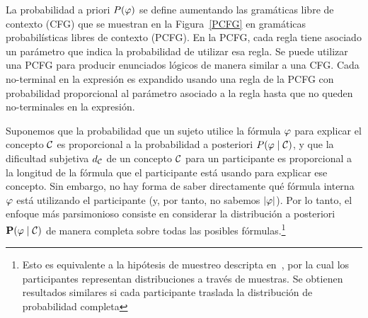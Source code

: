 La probabilidad a priori $P(\varphi)$ se define aumentando las gramáticas libre de contexto (CFG) que se muestran en la Figura~\ref{PCFG}  en gramáticas probabilísticas libres de contexto (PCFG). En la PCFG, cada regla tiene asociado un parámetro que indica la probabilidad de utilizar esa regla. Se puede utilizar una PCFG para producir enunciados lógicos de manera similar a una CFG. Cada no-terminal en la expresión es expandido usando una regla de la PCFG con probabilidad proporcional al parámetro asociado a la regla hasta que no queden no-terminales en la expresión. 


Suponemos que la probabilidad que un sujeto utilice la fórmula $\varphi$ para explicar el concepto $\mathcal{C}$ es proporcional a la probabilidad a posteriori $P(\varphi \mid \mathcal{C})$, y que la dificultad subjetiva $d_{\mathcal{C}}$ de un concepto $\mathcal{C}$ para un participante es proporcional a la longitud de la fórmula que el participante está usando para explicar ese concepto. Sin embargo, no hay forma de saber directamente qué fórmula interna $\varphi$ está utilizando el participante (y, por tanto, no sabemos $|\varphi|$). Por lo tanto, el enfoque más parsimonioso consiste en considerar la distribución a posteriori $\textbf{P}(\varphi \mid \mathcal{C})$ de manera completa sobre todas las posibles fórmulas.\footnote{Esto es equivalente a la hipótesis de muestreo descripta en~\cite{denison2013rational}, por la cual los participantes representan distribuciones a través de muestras. Se obtienen resultados similares si cada participante traslada la distribución de probabilidad completa} 

